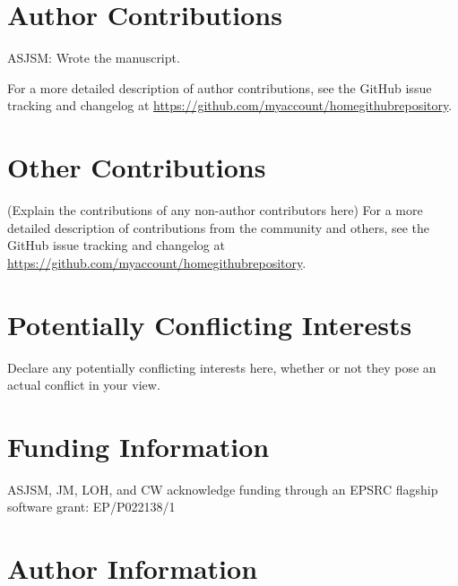 \documentclass[9pt,tutorial]{livecoms}
\newcommand{\githubrepository}{\url{https://github.com/myaccount/homegithubrepository}}  %
\begin{document}
\section*{Author Contributions}
ASJSM: Wrote the manuscript. 

For a more detailed description of author contributions,
see the GitHub issue tracking and changelog at \githubrepository.

\section*{Other Contributions}
%

(Explain the contributions of any non-author contributors here)
For a more detailed description of contributions from the community and others, see the GitHub issue tracking and changelog at \githubrepository.

\section*{Potentially Conflicting Interests}

Declare any potentially conflicting interests here, whether or not they pose an actual conflict in your view.

\section*{Funding Information}
ASJSM, JM, LOH, and CW acknowledge funding through an EPSRC flagship software grant: EP/P022138/1

\section*{Author Information}
\makeorcid




\end{document}
